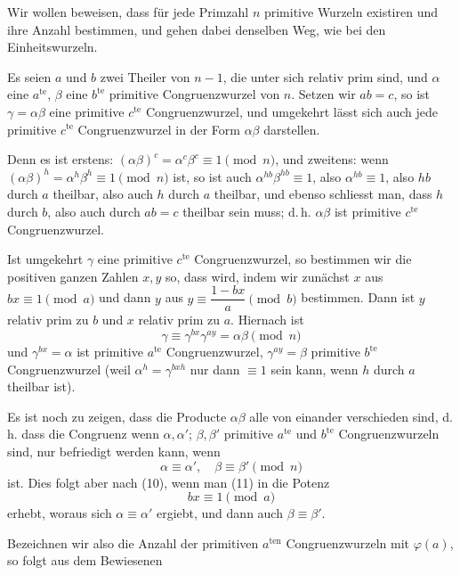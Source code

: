 
Wir wollen beweisen, dass für jede Primzahl $n$ primitive Wurzeln existiren
und ihre Anzahl bestimmen, und gehen dabei denselben Weg, wie bei den
Einheitswurzeln.

Es seien $a$ und $b$ zwei Theiler von $n-1$, die unter sich relativ prim
sind, und $\alpha$ eine $a^{\mathrm{te}}$, $\beta$ eine $b^{\mathrm{te}}$
primitive Congruenzwurzel von $n$. Setzen wir $ab=c$, so ist
$\gamma=\alpha\beta$ eine primitive $c^{\mathrm{te}}$ Congruenzwurzel, und
umgekehrt lässt sich auch jede primitive $c^{\mathrm{te}}$ Congruenzwurzel
in der Form $\alpha\beta$ darstellen.

Denn es ist erstens: $(\alpha\beta)^c = \alpha^c\beta^c \equiv 1 \pmod{n}$,
und zweitens: wenn $(\alpha\beta)^h = \alpha^h\beta^h \equiv 1 \pmod{n}$
ist, so ist auch $\alpha^{hb}\beta^{hb}\equiv 1$, also $\alpha^{hb}\equiv 1$,
also $hb$ durch $a$ theilbar, also auch $h$ durch $a$ theilbar, und ebenso
schliesst man, dass $h$ durch $b$, also auch durch $ab=c$ theilbar sein
muss; d.\,h. $\alpha\beta$ ist primitive $c^{\mathrm{te}}$
Congruenzwurzel.

Ist umgekehrt $\gamma$ eine primitive $c^{\mathrm{te}}$ Congruenzwurzel, so
bestimmen wir die positiven ganzen Zahlen $x, y$ so, dass
wird, indem wir zunächst $x$ aus $bx \equiv 1 \pmod{a}$ und dann $y$ aus
$y \equiv \dfrac{1-bx}{a} \pmod{b}$ bestimmen. Dann ist $y$ relativ prim
zu $b$ und $x$ relativ prim zu $a$. Hiernach ist
\[
\gamma \equiv \gamma^{bx}\gamma^{ay} = \alpha\beta \pmod{n}
\]
und $\gamma^{bx} = \alpha$ ist primitive $a^{\mathrm{te}}$
Congruenzwurzel, $\gamma^{ay} = \beta$ primitive $b^{\mathrm{te}}$
Congruenzwurzel (weil $\alpha^h = \gamma^{bxh}$ nur dann $\equiv 1$ sein
kann, wenn $h$ durch $a$ theilbar ist).

Es ist noch zu zeigen, dass die Producte $\alpha\beta$ alle von einander
verschieden sind, d.\,h. dass die Congruenz
wenn $\alpha, \alpha'$; $\beta, \beta'$ primitive $a^{\mathrm{te}}$ und
$b^{\mathrm{te}}$ Congruenzwurzeln sind, nur befriedigt werden kann, wenn
\[
\alpha \equiv \alpha', \quad \beta \equiv \beta' \pmod{n}
\]
ist. Dies folgt aber nach (10), wenn man (11) in die Potenz
\[
bx \equiv 1 \pmod{a}
\]
erhebt, woraus sich $\alpha \equiv \alpha'$ ergiebt, und dann auch
$\beta \equiv \beta'$.

Bezeichnen wir also die Anzahl der primitiven $a^{\mathrm{ten}}$
Congruenzwurzeln mit $\varphi(a)$, so folgt aus dem Bewiesenen
